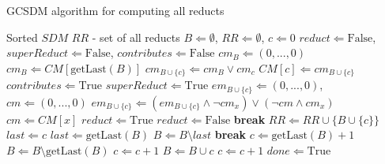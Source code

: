 \documentclass[authoryear,11pt]{elsarticle}
\begin{document}
	\begin{algorithm}
	\caption{GCSDM algorithm for computing all reducts}
	\label{alg:GCSDM}
	\begin{algorithmic}[1]
	  \Require Sorted $SDM$
      \Ensure $RR$ - set of all reducts
	  \State $B \Leftarrow \emptyset$, $RR \Leftarrow \emptyset$, $c \Leftarrow 0$
	  \State $reduct \Leftarrow \mathrm{False}$, $superReduct \Leftarrow \mathrm{False}$, 
	  		 $contributes \Leftarrow \mathrm{False}$
	  	\label{line:emptyB}
	  		\State $cm_B \Leftarrow (0,...,0)$
	  	\Else
	  		\State $cm_B \Leftarrow CM[\mathrm{getLast}(B)]$\label{line:notEmpty}
	  	\EndIf
	  	\State $cm_{B\cup \lbrace c\rbrace} \Leftarrow cm_B \vee cm_c$\label{line:updateCM}
	  	\State $CM[c] \Leftarrow cm_{B\cup \lbrace c\rbrace}$
	  	\label{line:contrib}
	  		\State $contributes \Leftarrow \mathrm{True}$
	  		\label{line:superReduct}
	  			\State $superReduct \Leftarrow \mathrm{True}$
	  			\State $em_{B\cup \lbrace c\rbrace} \Leftarrow (0,...,0)$, $cm \Leftarrow (0,...,0)$
	  			 \label{line:em}
	  				\State $em_{B\cup \lbrace c\rbrace} \Leftarrow (em_{B\cup \lbrace c\rbrace}\wedge \neg 
	  						cm_x) \vee (\neg cm \wedge cm_x)$
	  				\State $cm \Leftarrow CM[x]$\label{line:emEnd}
	  			\EndFor
	  			\State $reduct \Leftarrow \mathrm{True}$\label{line:reduct}
	  					\State $reduct \Leftarrow \mathrm{False}$
	  					\State \textbf{break}\label{line:reductEnd}
	  				\EndIf
	  			\EndFor
	  				\State $RR \Leftarrow RR \cup \lbrace B\cup \lbrace c\rbrace \rbrace$
	  			\EndIf
	  		\EndIf
	  	\EndIf
	  	 \label{line:cg}
	  		 \label{line:gap}
	  			\State $last \Leftarrow c$
	  				\State $last \Leftarrow \mathrm{getLast}(B)$
	  				\State $B \Leftarrow B\setminus last$
	  					\State \textbf{break}\label{line:gapEnd}
	  				\EndIf
	  			\EndWhile
	  		\EndIf
	  		\State $c \Leftarrow  \mathrm{getLast}(B)+1$
	  		\State $B \Leftarrow B\setminus \mathrm{getLast}(B)$\label{line:remLast}
	  	\Else
	  			\State $c \Leftarrow c+1$\label{line:replaceC}
	  		 \EndIf
	  			\State $B \Leftarrow B\cup c$\label{line:add1}
	  			\State $c \Leftarrow c+1$\label{line:add1End}
	  		 \EndIf
	  	\EndIf
	  	 \label{line:done}
	  		\State $done \Leftarrow \mathrm{True}$
	  	\EndIf
	  \EndWhile 
	\end{algorithmic}
	\end{algorithm}
	
\end{document}
